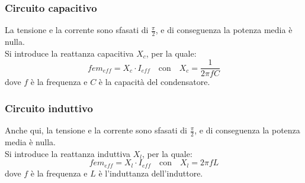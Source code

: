 \documentclass[12pt]{article}
\begin{document}
\subsubsection{Circuito capacitivo}
La tensione e la corrente sono sfasati di $\frac{\pi}{2}$, e di conseguenza la potenza media è nulla. \\
Si introduce la reattanza capacitiva $X_c$, per la quale:
$$ fem_{eff} = X_c \cdot I_{eff} \hspace{1em} \text{con} \hspace{1em} X_c = \frac{1}{2\pi fC} $$
dove $f$ è la frequenza e $C$ è la capacità del condensatore.

\subsubsection{Circuito induttivo}
Anche qui, la tensione e la corrente sono sfasati di $\frac{\pi}{2}$, e di conseguenza la potenza media è nulla. \\
Si introduce la reattanza induttiva $X_l$, per la quale:
$$ fem_{eff} = X_l \cdot I_{eff} \hspace{1em} \text{con} \hspace{1em} X_l = 2\pi fL $$
dove $f$ è la frequenza e $L$ è l'induttanza dell'induttore.
\end{document}
